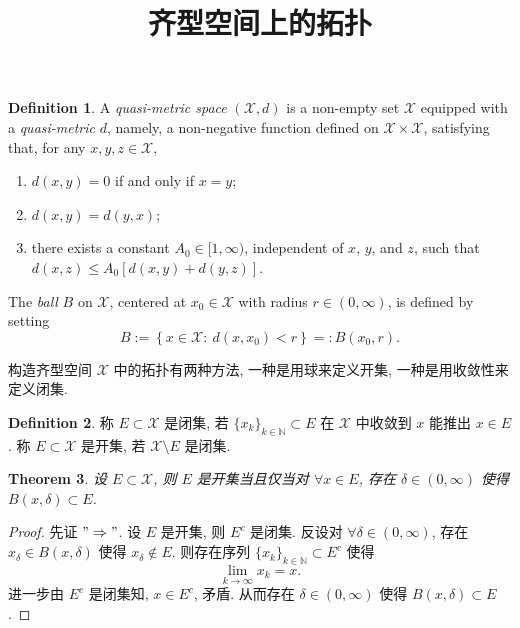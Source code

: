 \documentclass[a4paper,11pt]{article}
\title{齐型空间上的拓扑}
\newtheorem{theorem}{Theorem}[section]
\theoremstyle{definition}
\newtheorem{definition}[theorem]{Definition}
\begin{document}
\begin{CJK*}{UTF8}{gbsn}

\maketitle

\begin{definition} \label{10.21.1}
A \emph{quasi-metric space} $ (\mathcal{X}, d) $ is a non-empty set $ \mathcal{X} $ equipped with a \emph{quasi-metric} $ d $,
namely, a non-negative function defined on $ \mathcal{X} \times \mathcal{X} $, satisfying that, for any $ x, y, z \in \mathcal{X} $,
    \begin{enumerate}[{\rm(i)}]
        \item $ d(x, y) = 0 $ if and only if $ x = y $;
        \item $ d(x, y) = d(y, x) $;
        \item there exists a constant $ A_0 \in [1, \infty) $, independent of $ x $, $ y $,
            and $ z $, such that $ d(x, z) \leq A_0 [d(x, y) + d(y, z)] $.
    \end{enumerate}
\end{definition}

The \emph{ball} $ B $ on $ \mathcal{X} $, centered at $ x_0 \in \mathcal{X} $ with radius $ r \in (0, \infty) $, 
is defined by setting
$$
    B := \left\{x \in \mathcal{X} :\ d(x, x_0) < r \right\} =: B \left( x_0, r \right).
$$

构造齐型空间 $ \mathcal{X} $ 中的拓扑有两种方法, 一种是用球来定义开集, 一种是用收敛性来定义闭集.


\begin{definition} \label{def1}
    称 $ E \subset \mathcal{X} $ 是闭集, 若 $ \{x_k\}_{k \in \mathbb{N}} \subset E $ 在 $ \mathcal{X} $ 中收敛到 $ x $ 
    能推出 $ x \in E $.
    称 $ E \subset \mathcal{X} $ 是开集, 若 $ \mathcal{X} \setminus E $ 是闭集.
\end{definition}

\begin{theorem}
    设 $ E \subset \mathcal{X} $, 则 $ E $ 是开集当且仅当对 $ \forall x \in E $, 
    存在 $ \delta \in (0, \infty) $ 使得 $ B(x, \delta) \subset E $.
\end{theorem}

\begin{proof}
    先证 $ "\Rightarrow" $. 设 $ E $ 是开集, 则 $ E^c $ 是闭集.
    反设对 $ \forall \delta \in (0, \infty) $, 存在 $ x_\delta \in B(x, \delta) $ 使得 $ x_\delta \notin E $. 
    则存在序列 $ \{x_k\}_{k \in \mathbb{N}} \subset E^c $ 使得
    $$
        \lim_{k \to \infty} x_k = x.
    $$
    进一步由 $ E^c $ 是闭集知, $ x \in E^c $, 矛盾. 
    从而存在 $ \delta \in (0, \infty) $ 使得 $ B(x, \delta) \subset E $.
    

\end{proof}
\end{CJK*}
\end{document}
